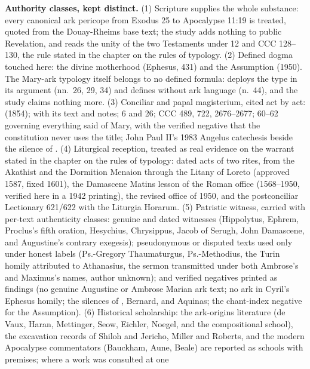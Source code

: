 \textbf{Authority classes, kept distinct.} (1) Scripture supplies the
whole substance: every canonical ark pericope from Exodus 25 to
Apocalypse 11:19 is treated, quoted from the Douay-Rheims base text; the
study adds nothing to public Revelation, and reads the unity of the two
Testaments under  12 and CCC 128--130, the rule stated
in the chapter on the rules of typology. (2) Defined dogma touched here: the divine
motherhood (Ephesus, 431) and the Assumption (1950). The Mary-ark
typology itself belongs to no defined formula:  deploys the type in its argument (nn.~26, 29, 34) and defines
without ark language (n.~44), and the study claims nothing more.
(3) Conciliar and papal magisterium, cited act by act:
 (1854);  with its
 text and notes;  6 and 26; CCC 489,
722, 2676--2677;  60--62 governing everything said of
Mary, with the verified negative that the constitution never uses the
title; John Paul II's 1983 Angelus catechesis beside the silence of
. (4) Liturgical reception, treated as real
evidence on the warrant stated in the chapter on the rules of typology: dated acts of
two rites, from the Akathist and the Dormition Menaion through the Litany
of Loreto (approved 1587, fixed 1601), the Damascene Matins lesson of the
Roman office (1568--1950, verified here in a 1942 printing), the revised
office of 1950, and the postconciliar Lectionary 621/622 with the
Liturgia Horarum. (5) Patristic witness, carried with per-text
authenticity classes: genuine and dated witnesses (Hippolytus, Ephrem,
Proclus's fifth oration, Hesychius, Chrysippus, Jacob of Serugh, John
Damascene, and Augustine's contrary exegesis); pseudonymous or disputed
texts used only under honest labels (Ps.-Gregory Thaumaturgus,
Ps.-Methodius, the Turin homily attributed to Athanasius, the sermon
transmitted under both Ambrose's and Maximus's names, author unknown);
and verified negatives printed as findings (no genuine Augustine or
Ambrose Marian ark text; no ark in Cyril's Ephesus homily; the silences
of , Bernard, and Aquinas; the chant-index negative for
the Assumption). (6) Historical scholarship: the ark-origins literature
(de Vaux, Haran, Mettinger, Seow, Eichler, Noegel, and the compositional
school), the excavation records of Shiloh and Jericho, Miller and
Roberts, and the modern Apocalypse commentators (Bauckham, Aune, Beale)
are reported as schools with premises; where a work was consulted at one
